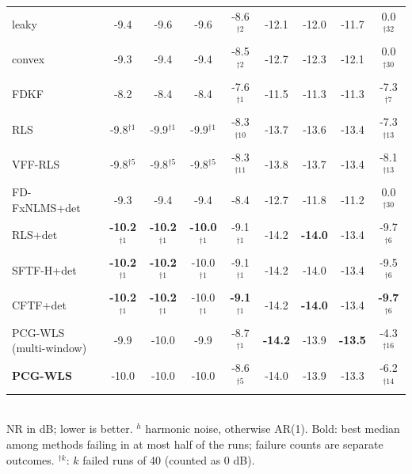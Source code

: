 \begin{table}[t]
{\begin{tabular}{lcccccccc}
leaky & -9.4 & -9.6 & -9.6 & -8.6$^{\dagger2}$ & -12.1 & -12.0 & -11.7 & 0.0$^{\dagger32}$ \\
convex & -9.3 & -9.4 & -9.4 & -8.5$^{\dagger2}$ & -12.7 & -12.3 & -12.1 & 0.0$^{\dagger30}$ \\
FDKF & -8.2 & -8.4 & -8.4 & -7.6$^{\dagger1}$ & -11.5 & -11.3 & -11.3 & -7.3$^{\dagger7}$ \\
RLS & -9.8$^{\dagger1}$ & -9.9$^{\dagger1}$ & -9.9$^{\dagger1}$ & -8.3$^{\dagger10}$ & -13.7 & -13.6 & -13.4 & -7.3$^{\dagger13}$ \\
VFF-RLS & -9.8$^{\dagger5}$ & -9.8$^{\dagger5}$ & -9.8$^{\dagger5}$ & -8.3$^{\dagger11}$ & -13.8 & -13.7 & -13.4 & -8.1$^{\dagger13}$ \\
FD-FxNLMS+det & -9.3 & -9.4 & -9.4 & -8.4 & -12.7 & -11.8 & -11.2 & 0.0$^{\dagger30}$ \\
RLS+det & \textbf{-10.2$^{\dagger1}$} & \textbf{-10.2$^{\dagger1}$} & \textbf{-10.0$^{\dagger1}$} & -9.1$^{\dagger1}$ & -14.2 & \textbf{-14.0} & -13.4 & -9.7$^{\dagger6}$ \\
SFTF-H+det & \textbf{-10.2$^{\dagger1}$} & \textbf{-10.2$^{\dagger1}$} & -10.0$^{\dagger1}$ & -9.1$^{\dagger1}$ & -14.2 & -14.0 & -13.4 & -9.5$^{\dagger6}$ \\
CFTF+det & \textbf{-10.2$^{\dagger1}$} & \textbf{-10.2$^{\dagger1}$} & -10.0$^{\dagger1}$ & \textbf{-9.1$^{\dagger1}$} & -14.2 & \textbf{-14.0} & -13.4 & \textbf{-9.7$^{\dagger6}$} \\
PCG-WLS (multi-window) & -9.9 & -10.0 & -9.9 & -8.7$^{\dagger1}$ & \textbf{-14.2} & -13.9 & \textbf{-13.5} & -4.3$^{\dagger16}$ \\
\textbf{PCG-WLS} & -10.0 & -10.0 & -10.0 & -8.6$^{\dagger5}$ & -14.0 & -13.9 & -13.3 & -6.2$^{\dagger14}$ \\
\bottomrule
\end{tabular}}
\\[2pt]{\scriptsize NR in dB; lower is better. $^h$ harmonic noise, otherwise AR(1). Bold: best median among methods failing in at most half of the runs; failure counts are separate outcomes. $^{\dagger k}$: $k$ failed runs of 40 (counted as 0 dB).}
\end{table}

